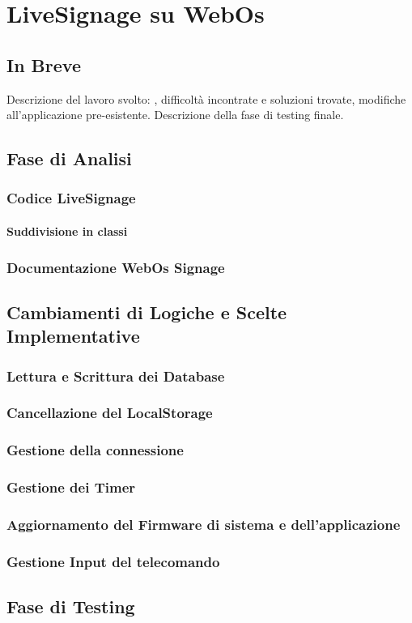 \chapter{LiveSignage su WebOs}
\section{In Breve}
Descrizione del lavoro svolto: , difficoltà incontrate e soluzioni trovate, modifiche all'applicazione pre-esistente. Descrizione della fase di testing finale.

\section{Fase di Analisi}
\subsection{Codice LiveSignage}
\subsubsection{Suddivisione in classi}
\subsection{Documentazione WebOs Signage}

\section{Cambiamenti di Logiche e Scelte Implementative}
\subsection{Lettura e Scrittura dei Database}
\subsection{Cancellazione del LocalStorage}
\subsection{Gestione della connessione}
\subsection{Gestione dei Timer}
\subsection{Aggiornamento del Firmware di sistema e dell'applicazione}
\subsection{Gestione Input del telecomando}

\section{Fase di Testing}


